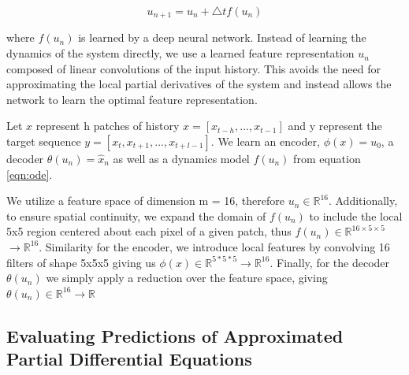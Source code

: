 \documentclass[12pt]{article}
\newcommand{\R}{ \ensuremath{\mathbb{R}}}  %
\theoremstyle{plain}
\theoremstyle{remark}
\theoremstyle{definition}
\begin{document}
$$u_{n+1} = u_n + \bigtriangleup t f(u_n) \label{eqn:ode} $$

where $f(u_n)$ is learned by a deep neural network. Instead of learning the dynamics of the system directly, we use a learned feature representation $u_n$ composed of linear convolutions of the input history. This avoids the need for approximating the local partial derivatives of the system and instead allows the network to learn the optimal feature representation.


Let $x$ represent h patches of history $x = [x_{t-h}, ..., x_{t-1}]$ and y represent the target sequence $y = 
[x_{t}, x_{t+1},...,x_{t+l-1}]$.  We learn an encoder, $\phi(x) = u_0$, a decoder $\theta(u_n) = \hat{x}_n$ as well as a dynamics model $f(u_n)$ from equation \ref{eqn:ode}.  

We utilize a feature space of dimension m = 16, therefore $u_n \in \R^{16}$. Additionally, to ensure spatial continuity, we expand the domain of  $f(u_n)$ to include the local 5x5 region centered about each pixel of a given patch, thus $f(u_n) \in \R^{16 \times 5 \times 5}$ $\rightarrow \R^{16}$. 
Similarity for the encoder, we introduce local features by convolving 16 filters of shape 5x5x5 giving us $\phi(x) \in \R^{5*5*5} \rightarrow \R^{16}$. Finally, for the decoder $\theta(u_n)$ we simply apply a reduction over the feature space, giving  $\theta(u_n) \in \R^{16} \rightarrow \R$




\subsection{Evaluating Predictions of Approximated Partial Differential Equations}
\end{document}
